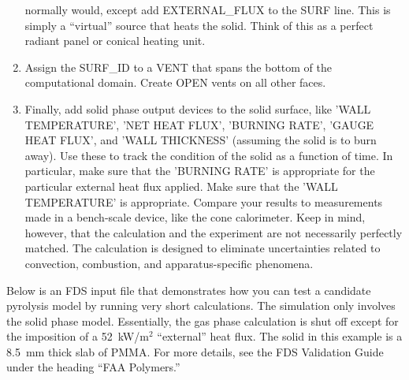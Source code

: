 \documentclass[11pt]{book}
\begin{document}
\begin{enumerate}
normally would, except add {\ct EXTERNAL\_FLUX} to the {\ct SURF}
line. This is simply a ``virtual'' source that heats the solid. Think
of this as a perfect radiant panel or conical heating unit.
\item Assign the {\ct SURF\_ID} to a {\ct VENT} that spans the bottom
of the computational domain. Create {\ct OPEN} vents on all other
faces.
\item Finally, add solid phase output devices to the solid surface,
like {\ct 'WALL TEMPERATURE'}, {\ct 'NET HEAT FLUX'}, {\ct 'BURNING RATE'},
{\ct 'GAUGE HEAT FLUX'}, and {\ct 'WALL THICKNESS'} (assuming the solid
is to burn away). Use these to track the condition of the solid as a
function of time. In particular, make sure that the {\ct 'BURNING RATE'} is appropriate for the particular external heat flux
applied. Make sure that the {\ct 'WALL TEMPERATURE'} is
appropriate. Compare your results to measurements made in a
bench-scale device, like the cone calorimeter. Keep in mind, however,
that the calculation and the experiment are not necessarily perfectly
matched. The calculation is designed to eliminate uncertainties
related to convection, combustion, and apparatus-specific phenomena.
\end{enumerate}


\noindent Below is an FDS input file that demonstrates how you can test a candidate pyrolysis model by running very short calculations. The simulation only
involves the solid phase model. Essentially, the gas phase calculation is
shut off except for the imposition of a 52~kW/m$^2$ ``external'' heat flux. The solid in this example is a 8.5~mm thick slab of PMMA. For more
details, see the FDS Validation Guide under the heading ``FAA Polymers.''
\end{document}
